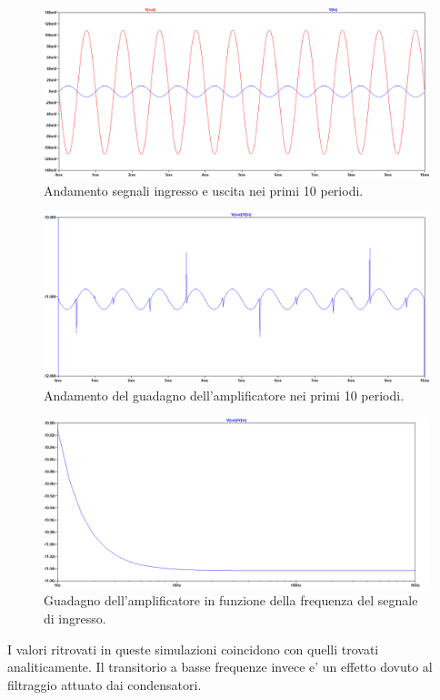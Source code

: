 \documentclass[a4paper,10pt]{article}
\begin{document}
\begin{figure}[h!]
  	\centering
 	\includegraphics[width=0.7\linewidth]{es2-2-3sign.png}
  	\caption{Andamento segnali ingresso e uscita nei primi 10 periodi.}
  	\label{fig:inout2}
\end{figure}
\begin{figure}[h!]
  	\centering
 	\includegraphics[width=0.7\linewidth]{es2-2-3gain.png}
  	\caption{Andamento del guadagno dell'amplificatore nei primi 10 periodi.}
  	\label{fig:gain10-2}
\end{figure}
\begin{figure}[h!]
  	\centering
 	\includegraphics[width=0.7\linewidth]{es2-2-3freq.png}
  	\caption{Guadagno dell'amplificatore in funzione della frequenza del segnale di ingresso.}
  	\label{fig:gainfreq-2}
\end{figure}
I valori ritrovati in queste simulazioni coincidono con quelli trovati analiticamente. Il transitorio a basse frequenze invece e' un effetto dovuto al filtraggio attuato dai condensatori.

\newpage
\end{document}
